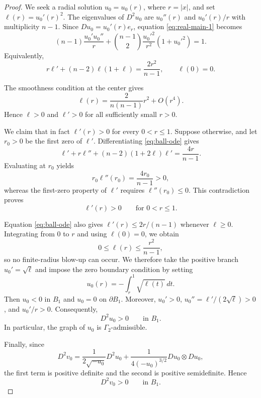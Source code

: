 \documentclass{article}
\numberwithin{equation}{section}
\begin{document}
\begin{proof}
We seek a radial solution $u_0=u_0(r)$, where $r=|x|$, and set
$\ell(r)=u_0'(r)^2$. The eigenvalues of $D^2u_0$ are $u_0''(r)$ and
$u_0'(r)/r$ with multiplicity $n-1$. Since
$Du_0=u_0'(r)e_r$, equation \eqref{eq:real-main-1} becomes
\[
(n-1)\frac{u_0'u_0''}{r}
+
\binom{n-1}{2}
\frac{u_0'^2}{r^2}(1+u_0'^2)
=
1.
\]
Equivalently,
\begin{equation}\label{eq:ball-ode}
r\ell'+(n-2)\ell(1+\ell)
=
\frac{2r^2}{n-1},
\qquad
\ell(0)=0.
\end{equation}

The smoothness condition at the center gives
\begin{equation}\label{eq:ball-center}
\ell(r)
=
\frac{2}{n(n-1)}r^2+O(r^4).
\end{equation}
Hence $\ell>0$ and $\ell'>0$ for all sufficiently small $r>0$.

We claim that in fact $\ell'(r)>0$ for every $0<r\le1$. Suppose
otherwise, and let $r_0>0$ be the first zero of $\ell'$. Differentiating
\eqref{eq:ball-ode} gives
\[
\ell'+r\ell''+(n-2)(1+2\ell)\ell'
=
\frac{4r}{n-1}.
\]
Evaluating at $r_0$ yields
\[
r_0\ell''(r_0)
=
\frac{4r_0}{n-1}>0,
\]
whereas the first-zero property of $\ell'$ requires
$\ell''(r_0)\le0$. This contradiction proves
\begin{equation}\label{eq:ell-positive}
\ell'(r)>0
\qquad\text{for }0<r\le1.
\end{equation}

Equation \eqref{eq:ball-ode} also gives
$\ell'(r)\le2r/(n-1)$ whenever $\ell\ge0$. Integrating from $0$ to $r$ and using
$\ell(0)=0$, we obtain
\[
0\le \ell(r)\le \frac{r^2}{n-1},
\]
so no finite-radius blow-up can occur. We therefore take the positive branch
$u_0'=\sqrt{\ell}$ and impose the zero boundary condition by setting
\begin{equation}\label{eq:ball-solution}
u_0(r)
=
-\int_r^1\sqrt{\ell(t)}\,dt.
\end{equation}
Then $u_0<0$ in $B_1$ and $u_0=0$ on $\partial B_1$. Moreover,
$u_0'>0$, $u_0''=\ell'/(2\sqrt{\ell})>0$, and $u_0'/r>0$.
Consequently,
\[
D^2u_0>0
\qquad\text{in }B_1.
\]
In particular, the graph of $u_0$ is $\Gamma_2$-admissible.

Finally, since
\[
D^2v_0
=
\frac{1}{2\sqrt{-u_0}}D^2u_0
+
\frac{1}{4(-u_0)^{3/2}}
Du_0\otimes Du_0,
\]
the first term is positive definite and the second is positive
semidefinite. Hence
\[
D^2v_0>0
\qquad\text{in }B_1.
\]
\end{proof}
\end{document}
